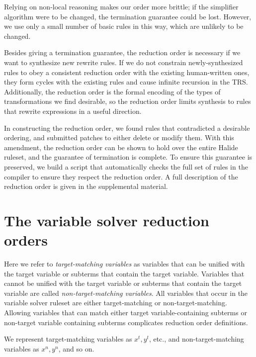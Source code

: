 Relying on non-local reasoning makes our order more brittle; if the simplifier algorithm were to be changed, the termination guarantee could be lost. However, we use only a small number of basic rules in this way, which are unlikely to be changed.

Besides giving a termination guarantee, the reduction order is necessary if we want to synthesize new rewrite rules. If we do not constrain newly-synthesized rules to obey a consistent reduction order with the existing human-written ones, they form cycles with the existing rules and cause infinite recursion in the TRS. Additionally, the reduction order is the formal encoding of the types of transformations we find desirable, so the reduction order limits synthesis to rules that rewrite expressions in a useful direction.

In constructing the reduction order, we found \NumOrderingProblems rules that contradicted a desirable ordering, and submitted patches to either delete or modify them. With this amendment, the reduction order can be shown to hold over the entire Halide ruleset, and the guarantee of termination is complete. To ensure this guarantee is preserved, we build a script that automatically checks the full set of rules in the compiler to ensure they respect the reduction order. A full description of the reduction order is given in the supplemental material.


\section{The variable solver reduction orders}

Here we refer to \emph{target-matching variables} as variables that can be unified with the target variable or subterms that contain the target variable. Variables that cannot be unified with the target variable or subterms that contain the target variable are called \emph{non-target-matching variables}. All variables that occur in the variable solver ruleset are either target-matching or non-target-matching. Allowing variables that can match either target variable-containing subterms or non-target variable containing subterms complicates reduction order definitions. 

We represent target-matching variables as $x^t, y^t$, etc., and non-target-matching variables as $x^n, y^n$, and so on.

